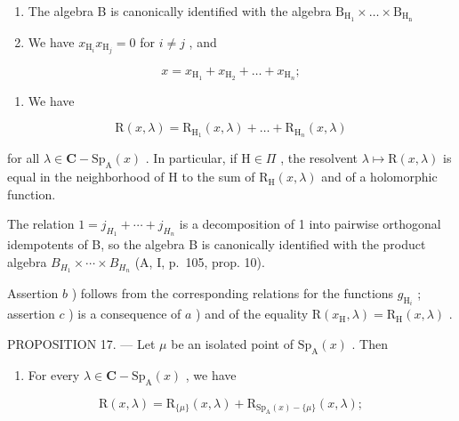 \begin{enumerate}
\def\labelenumi{\alph{enumi})}
\item
  The algebra B is canonically identified with the algebra \(\mathrm{B_{H_1}}\times \dots \times \mathrm{B_{H_n}}\)
\item
  We have \(x_{\mathrm{H}_i}x_{\mathrm{H}_j} = 0\) for \(i\neq j\) , and
\end{enumerate}

\[
x = x _ {\mathrm{H} _ {1}} + x _ {\mathrm{H} _ {2}} + \dots + x _ {\mathrm{H} _ {n}};
\]

\begin{enumerate}
\def\labelenumi{\alph{enumi})}
\setcounter{enumi}{2}
\tightlist
\item
  We have
\end{enumerate}

\[
\mathrm{R} (x, \lambda) = \mathrm{R} _ {\mathrm{H} _ {1}} (x, \lambda) + \dots + \mathrm{R} _ {\mathrm{H} _ {n}} (x, \lambda)\tag{19}
\]

for all \(\lambda\in\mathbf{C}-\mathrm{Sp}_{\mathrm{A}}(x)\) . In particular, if \(\mathrm{H}\in\Pi\) , the resolvent \(\lambda\mapsto\mathrm{R}(x,\lambda)\) is equal in the neighborhood of \(\mathrm{H}\) to the sum of \(\mathrm{R}_{\mathrm{H}}(x,\lambda)\) and of a holomorphic function.

The relation \(1 = j_{H_{1}} + \cdots + j_{H_{n}}\) is a decomposition of 1 into pairwise orthogonal idempotents of B, so the algebra B is canonically identified with the product algebra \(B_{H_{1}} \times \cdots \times B_{H_{n}}\) (A, I, p.~105, prop. 10).

Assertion \(b\) ) follows from the corresponding relations for the functions \(g_{\mathrm{H}_i}\) ; assertion \(c\) ) is a consequence of \(a\) ) and of the equality \(\mathrm{R}(x_{\mathrm{H}},\lambda) = \mathrm{R}_{\mathrm{H}}(x,\lambda)\) .

PROPOSITION 17. --- Let \(\mu\) be an isolated point of \(\mathrm{Sp}_{\mathrm{A}}(x)\) . Then

\begin{enumerate}
\def\labelenumi{\alph{enumi})}
\tightlist
\item
  For every \(\lambda \in \mathbf{C} - \mathrm{Sp}_{\mathrm{A}}(x)\) , we have
\end{enumerate}

\[
\mathrm{R} (x, \lambda) = \mathrm{R} _ {\{\mu \}} (x, \lambda) + \mathrm{R} _ {\mathrm{Sp} _ {\mathrm{A}} (x) - \{\mu \}} (x, \lambda);
\]

